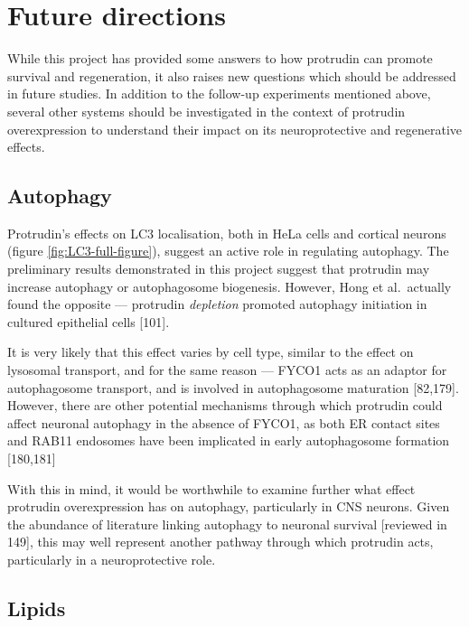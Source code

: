 \documentclass[
  12pt,
  a4paper,
]{book}
\begin{document}
\section{Future directions}\label{future-directions}

While this project has provided some answers to how protrudin can promote survival and regeneration, it also raises new questions which should be addressed in future studies. In addition to the follow-up experiments mentioned above, several other systems should be investigated in the context of protrudin overexpression to understand their impact on its neuroprotective and regenerative effects.

\subsection{Autophagy}\label{autophagy}

Protrudin's effects on LC3 localisation, both in HeLa cells and cortical neurons (figure \ref{fig:LC3-full-figure}), suggest an active role in regulating autophagy. The preliminary results demonstrated in this project suggest that protrudin may increase autophagy or autophagosome biogenesis. However, Hong et al.~actually found the opposite --- protrudin \emph{depletion} promoted autophagy initiation in cultured epithelial cells {[}101{]}.

It is very likely that this effect varies by cell type, similar to the effect on lysosomal transport, and for the same reason --- FYCO1 acts as an adaptor for autophagosome transport, and is involved in autophagosome maturation {[}82,179{]}. However, there are other potential mechanisms through which protrudin could affect neuronal autophagy in the absence of FYCO1, as both ER contact sites and RAB11 endosomes have been implicated in early autophagosome formation {[}180,181{]}

With this in mind, it would be worthwhile to examine further what effect protrudin overexpression has on autophagy, particularly in CNS neurons. Given the abundance of literature linking autophagy to neuronal survival {[}reviewed in 149{]}, this may well represent another pathway through which protrudin acts, particularly in a neuroprotective role.

\subsection{Lipids}\label{discussion-lipids}
\end{document}
